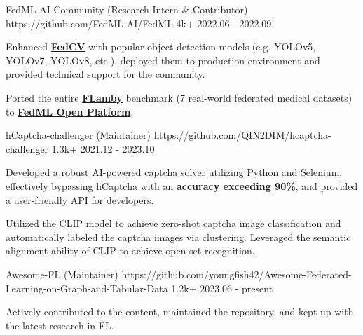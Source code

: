 \begin{cventries}

\cvproject
{FedML-AI Community (Research Intern \& Contributor)}
{https://github.com/FedML-AI/FedML}
{4k+}
{2022.06 - 2022.09}
{
\begin{cvitems}
\item {Enhanced \href{https://github.com/FedML-AI/FedCV}{\textbf{FedCV}} with popular object detection models (e.g. YOLOv5, YOLOv7, YOLOv8, etc.), deployed them to production environment and provided technical support for the community.}
\item {Ported the entire \href{https://github.com/owkin/FLamby}{\textbf{FLamby}} benchmark (7 real-world federated medical datasets) to \href{https://open.fedml.ai/}{\textbf{FedML Open Platform}}.}
\end{cvitems}
}

\cvproject
{hCaptcha-challenger (Maintainer)}
{https://github.com/QIN2DIM/hcaptcha-challenger}
{1.3k+}
{2021.12 - 2023.10}
{
\begin{cvitems}
\item {Developed a robust AI-powered captcha solver utilizing Python and Selenium, effectively bypassing hCaptcha with an \textbf{accuracy exceeding 90\%}, and provided a user-friendly API for developers.}
\item {Utilized the CLIP model to achieve zero-shot captcha image classification and automatically labeled the captcha images via clustering. Leveraged the semantic alignment ability of CLIP to achieve open-set recognition.}
\end{cvitems}
}

\cvproject
{Awesome-FL (Maintainer)}
{https://github.com/youngfish42/Awesome-Federated-Learning-on-Graph-and-Tabular-Data}
{1.2k+}
{2023.06 - present}
{
\begin{cvitems}
\item {Actively contributed to the content, maintained the repository, and kept up with the latest research in FL.}
\end{cvitems}
}


\end{cventries}
